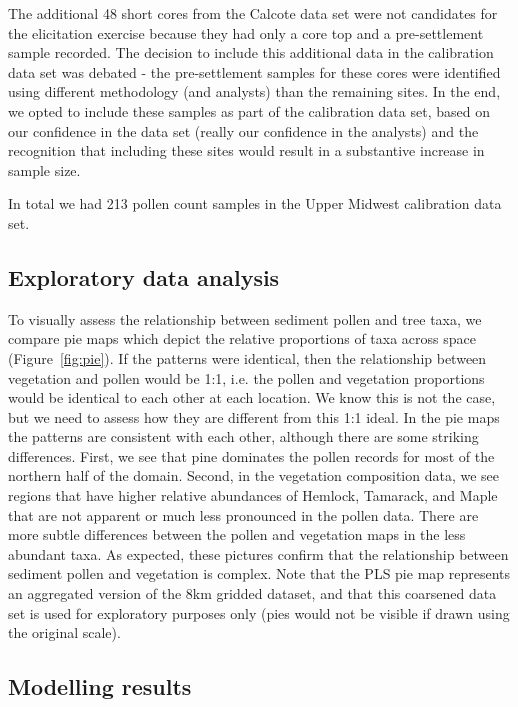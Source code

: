 \documentclass[12pt]{article}
\begin{document}
The additional 48 short cores from the Calcote data set were not
candidates for the elicitation exercise because they had only a core
top and a pre-settlement sample recorded. The decision to include this
additional data in the calibration data set was debated - the
pre-settlement samples for these cores were identified using different
methodology (and analysts) than the remaining sites. In the end, we
opted to include these samples as part of the calibration data set,
based on our confidence in the data set (really our confidence in
the analysts) and the recognition that including these sites would
result in a substantive increase in sample size.

In total we had 213 pollen count samples in the Upper Midwest
calibration data set.

\subsection{Exploratory data analysis}

To visually assess the relationship between sediment pollen and tree
taxa, we compare pie maps which depict the relative proportions of
taxa across space (Figure~\ref{fig:pie}). If the patterns were
identical, then the relationship between vegetation and pollen would
be 1:1, i.e. the pollen and vegetation proportions would be identical
to each other at each location. We know this is not the case, but we
need to assess how they are different from this 1:1 ideal. In the pie
maps the patterns are consistent with each other, although there are
some striking differences. First, we see that pine dominates the
pollen records for most of the northern half of the domain. Second, in
the vegetation composition data, we see regions that have higher
relative abundances of Hemlock, Tamarack, and Maple that are not
apparent or much less pronounced in the pollen data. There are more
subtle differences between the pollen and vegetation maps in the less
abundant taxa. As expected, these pictures confirm that the
relationship between sediment pollen and vegetation is complex. Note
that the PLS pie map represents an aggregated version of the 8km
gridded dataset, and that this coarsened data set is used for
exploratory purposes only (pies would not be visible if drawn using
the original scale).

\subsection{Modelling results}
\end{document}
